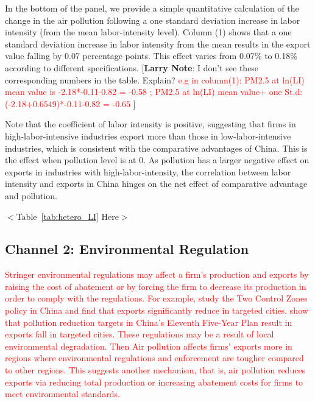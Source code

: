 \documentclass[12pt]{article}
\begin{document}
In the bottom of the panel, we provide a simple quantitative calculation of the change in the air pollution following
a one standard deviation increase in labor intensity (from the mean labor-intensity level). Column (1) shows that a one standard deviation increase in labor intensity from the mean results in the export value falling by 0.07 percentage points. This effect varies from 0.07\% to 0.18\% according to different
specifications.  [\textbf{Larry Note}: I don't see these corresponding
numbers in the table. Explain? \textcolor{red}{e.g in column(1): PM2.5 at ln(LI) mean value is -2.18*-0.11-0.82 = -0.58 ; PM2.5 at ln(LI) mean value+ one St.d: (-2.18+0.6549)*-0.11-0.82 = -0.65 }] 

Note that the coefficient of labor intensity is positive, suggesting that
firms in high-labor-intensive industries export more than those in
low-labor-intensive industries, which is consistent with the comparative
advantages of China. This is the effect when pollution level is at 0. As
pollution has a larger negative effect on exports in industries with
high-labor-intensity, the correlation between labor intensity and exports
in China hinges on the net effect of comparative advantage and pollution.

\begin{center}
  $<$Table~\ref{tab:hetero_LI} Here$>$
  \end{center}

\subsection{Channel 2: Environmental Regulation}
\label{sec:Channel 2}
\textcolor{red}{Stringer environmental regulations may affect a firm's
production and exports by raising the cost of abatement or by 
forcing the firm to decrease its production in order to comply with the
regulations. For example, \cite%
{hering2014environmental} study the Two Control Zones policy in China and
find that exports significantly reduce in targeted cities. \cite%
{shi2018environmental} show that pollution reduction targets in China's
Eleventh Five-Year Plan result in exports fall in targeted cities. These regulations may be a result of local environmental degradation. Then Air pollution affects firms’ exports more in regions where
environmental regulations and enforcement are tougher compared to other regions. This suggests another mechanism, that is, air pollution reduces
exports via reducing total production or increasing abatement costs for firms to meet
environmental standards.}
\end{document}
